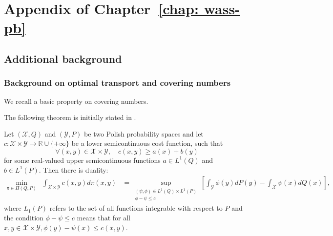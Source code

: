 \chapter{Appendix of Chapter~\ref{chap: wass-pb}}
\label{ap:mv-sto}

\minitoc

\begin{noaddcontents}

\section{Additional background}
\label{sec: background}

\subsection{Background on optimal transport and covering numbers}
\label{sec: back_compact}



We recall a basic property on covering numbers.

The following theorem is initially stated in \citep[Theorem 5.10]{villani2009optimal}.
\begin{theorem}
\label{th: kanto_dual}
Let $(\mathcal{X}, Q)$ and $(\mathcal{Y}, P)$ be two Polish probability spaces and let $c: \mathcal{X} \times \mathcal{Y} \rightarrow \mathbb{R} \cup\{+\infty\}$ be a lower semicontinuous cost function, such that
$$
\forall(x, y) \in \mathcal{X} \times \mathcal{Y}, \quad c(x, y) \geq a(x)+b(y)
$$
for some real-valued upper semicontinuous functions $a \in L^1(Q)$ and $b \in L^1(P)$. Then there is duality:
$$
\begin{aligned}
\min _{\pi \in \Pi(Q, P)} & \int_{\mathcal{X} \times \mathcal{Y}} c(x, y) d \pi(x, y) & =\sup _{\substack{(\psi, \phi) \in L^1(Q) \times L^1(P)\\ \phi-\psi \leq c}}\left[\int_{\mathcal{Y}} \phi(y) dP(y)-\int_{\mathcal{X}} \psi(x) dQ(x)\right],
\end{aligned}
$$
where $L_1(P)$ refers to the set of all functions integrable with respect to $P$ and the condition $\phi-\psi \leq c$ means that for all $x,y \in \mathcal{X}\times \mathcal{Y}, \phi(y)-\psi(x) \leq c(x,y)$.
\end{theorem}



\end{noaddcontents}
